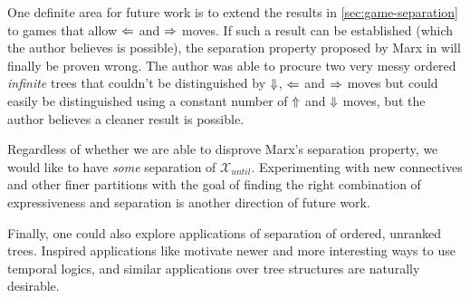 \documentclass[a4paper,UKenglish,cleveref, autoref, thm-restate, numberwithinsect]{lipics-v2021}
\def\Larrow{\ensuremath\mathord{\Leftarrow}}
\def\Rarrow{\ensuremath\mathord{\Rightarrow}}
\def\Uarrow{\ensuremath\mathord{\Uparrow}}
\def\Darrow{\ensuremath\mathord{\Downarrow}}
\begin{document}
One definite area for future work is to extend the results in \cref{sec:game-separation} to games that allow $\Larrow$ and $\Rarrow$ moves. If such a result can be established (which the author believes is possible), the separation property proposed by Marx in \cite{xpathComplete} will finally be proven wrong. The author was able to procure two very messy ordered \textit{infinite} trees that couldn't be distinguished by $\Darrow$, $\Larrow$ and $\Rarrow$ moves but could easily be distinguished using a constant number of $\Uarrow$ and $\Darrow$ moves, but the author believes a cleaner result is possible.

Regardless of whether we are able to disprove Marx's separation property, we would like to have \textit{some} separation of $\mathcal{X}_{until}$. Experimenting with new connectives and other finer partitions with the goal of finding the right combination of expressiveness and separation is another direction of future work.

Finally, one could also explore applications of separation of ordered, unranked trees. Inspired applications like \cite{DecPastImpFuture89} motivate newer and more interesting ways to use temporal logics, and similar applications over tree structures are naturally desirable.





\end{document}
